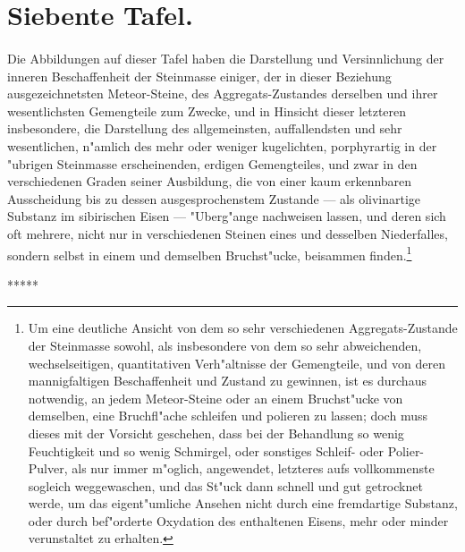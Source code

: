 \documentclass[a4paper, 11pt, oneside, german]{article}
\begin{document}
\section{Siebente Tafel.}
\paragraph{}
Die Abbildungen auf dieser Tafel haben die Darstellung und Versinnlichung der inneren Beschaffenheit der Steinmasse einiger, der in dieser Beziehung ausgezeichnetsten Meteor-Steine, des Aggregats-Zustandes derselben und ihrer wesentlichsten Gemengteile zum Zwecke, und in Hinsicht dieser letzteren insbesondere, die Darstellung des allgemeinsten, auffallendsten und sehr wesentlichen, n"amlich des mehr oder weniger kugelichten, porphyrartig in der "ubrigen Steinmasse erscheinenden, erdigen Gemengteiles, und zwar in den verschiedenen Graden seiner Ausbildung, die von einer kaum erkennbaren Ausscheidung bis zu dessen ausgesprochenstem Zustande --- als olivinartige Substanz im sibirischen Eisen --- "Uberg"ange nachweisen lassen, und deren sich oft mehrere, nicht nur in verschiedenen Steinen eines und desselben Niederfalles, sondern selbst in einem und demselben Bruchst"ucke, beisammen finden.\footnote{Um eine deutliche Ansicht von dem so sehr verschiedenen Aggregats-Zustande der Steinmasse sowohl, als insbesondere von dem so sehr abweichenden, wechselseitigen, quantitativen Verh"altnisse der Gemengteile, und von deren mannigfaltigen Beschaffenheit und Zustand zu gewinnen, ist es durchaus notwendig, an jedem Meteor-Steine oder an einem Bruchst"ucke von demselben, eine Bruchfl"ache schleifen und polieren zu lassen; doch muss dieses mit der Vorsicht geschehen, dass bei der Behandlung so wenig Feuchtigkeit und so wenig Schmirgel, oder sonstiges Schleif- oder Polier-Pulver, als nur immer m"oglich, angewendet, letzteres aufs vollkommenste sogleich weggewaschen, und das St"uck dann schnell und gut getrocknet werde, um das eigent"umliche Ansehen nicht durch eine fremdartige Substanz, oder durch bef"orderte Oxydation des enthaltenen Eisens, mehr oder minder verunstaltet zu erhalten.}

\centerline{*\hspace{15mm}*\hspace{15mm}*\hspace{15mm}*\hspace{15mm}*}
\bigskip
\end{document}
